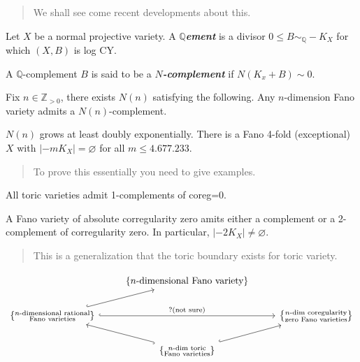 \begin{quotation}
	We shall see come recent developments about this.
\end{quotation}

\begin{defn}
	Let $X$ be a normal projective variety. A \textit{\textbf{$\mathbb{Q}$ement}} is a divisor $0\leq B \sim_{\mathbb{Q}}-K_{X}  $ for which $(X,B)$ is log CY.

	A $\mathbb{Q}$-complement $B$ is said to be a \textit{\textbf{$N$-complement}} if $N(K_{x}+B)\sim 0$.
\end{defn}

\begin{thm}\leavevmode
	Fix $n \in \mathbb{Z}_{>0}$, there exists $N(n)$ satisfying the following. Any $n$-dimension Fano variety admits a $N(n)$-complement.
\end{thm}

\begin{thm}[Totaro, 22]\leavevmode
	$N(n)$ grows at least doubly exponentially. There is a Fano 4-fold (exceptional) $X$ with $|-mK_{X}|=\varnothing $ for all $m\leq 4.677.233$.
\end{thm}

\begin{quotation}
	To prove this essentially you need to give examples.
\end{quotation}

\begin{remark}
	All toric varieties admit 1-complements of coreg=0.
\end{remark}

\begin{thm}\leavevmode
	A Fano variety of absolute corregularity zero amits either a complement or a 2-complement of corregularity zero. In particular, $|-2K_{X}| \neq \varnothing $.
\end{thm}

\begin{quotation}
	This is a generalization that the toric boundary exists for toric variety.
\end{quotation}

\[\begin{tikzcd}
	&\{n\text{-dimensional Fano variety} \}&\\
	\left\{ \substack{n\text{-dimensional rational}  \\ \text{Fano varieties} } \right\}\arrow[rr,"?\text{(not sure)}", hook]\arrow[ur,hook]&&\left\{ \substack{n\text{-dim coregularity}  \\ \text{zero Fano varieties} } \right\} \\
&\left\{ \substack{n\text{-dim toric}  \\ \text{Fano varieties} } \right\} \arrow[ul,hook]\arrow[ur,hook]
\end{tikzcd}\]

